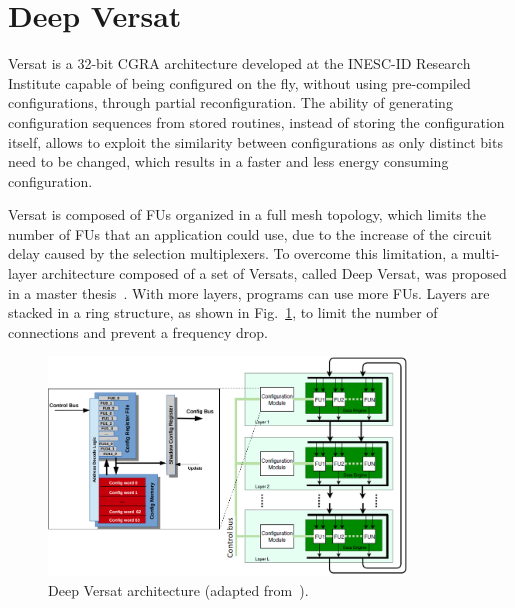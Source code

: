 \section{Deep Versat}
\label{section:versat}

Versat \cite{lopes:versat} is a 32-bit CGRA architecture developed at the INESC-ID Research Institute capable of being configured on the fly, without using pre-compiled configurations, through partial reconfiguration. The ability of generating configuration sequences from stored routines, instead of storing the configuration itself, allows to exploit the similarity between configurations as only distinct bits need to be changed, which results in a faster and less energy consuming configuration. 

Versat is composed of FUs organized in a full mesh topology, which limits the number of FUs that an application could use, due to the increase of the circuit delay caused by the selection multiplexers. To overcome this limitation, a multi-layer architecture composed of a set of Versats, called Deep Versat, was proposed in a master thesis~\cite{valter:deep_versat}. With more layers, programs can use more FUs. Layers are stacked in a ring structure, as shown in Fig.~\ref{fig:deep_versat}, to limit the number of connections and prevent a frequency drop.

\vspace{-0.3cm}
\begin{figure}[!htb]
  \centering
  \includegraphics[width=0.85\textwidth]{Figures/deep_versat.png}
  \caption{Deep Versat architecture (adapted from~\cite{valter:deep_versat}).}
  \label{fig:deep_versat}
\end{figure}
\vspace{-0.15cm}


